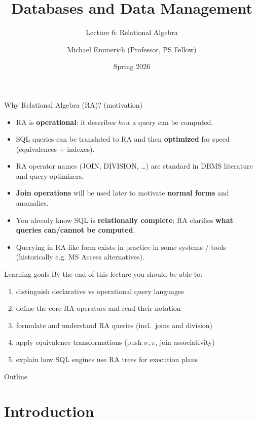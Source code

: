 \documentclass[10pt,aspectratio=169]{beamer}
\title{Databases and Data Management}
\subtitle{Lecture 6: Relational Algebra}
\author{Michael Emmerich (Professor, PS Fellow)}
\institute{Faculty of Information Technology\\University of Jyväskylä}
\date{Spring 2026}
\begin{document}
\maketitle

\begin{frame}{Why Relational Algebra (RA)? (motivation)}
\begin{itemize}
  \item RA is \textbf{operational}: it describes \emph{how} a query can be computed.
  \item SQL queries can be translated to RA and then \textbf{optimized} for speed (equivalences + indexes).
  \item RA operator names (JOIN, DIVISION, \dots) are standard in DBMS literature and query optimizers.
  \item \textbf{Join operations} will be used later to motivate \textbf{normal forms} and anomalies.
  \item You already know SQL is \textbf{relationally complete}; RA clarifies \textbf{what queries can/cannot be computed}.
  \item Querying in RA-like form exists in practice in some systems / tools (historically e.g. MS Access alternatives).
\end{itemize}
\end{frame}

\begin{frame}{Learning goals}
By the end of this lecture you should be able to:
\begin{enumerate}
  \item distinguish declarative vs operational query languages
  \item define the core RA operators and read their notation
  \item formulate and understand RA queries (incl.\ joins and division)
  \item apply equivalence transformations (push \(\sigma,\pi\), join associativity)
  \item explain how SQL engines use RA trees for execution plans
\end{enumerate}
\end{frame}

\begin{frame}{Outline}
\tableofcontents
\end{frame}

\section{Introduction}
\end{document}
